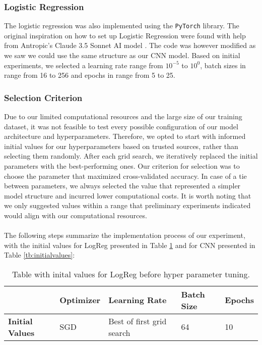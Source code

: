\subsubsection{Logistic Regression}
The logistic regression was also implemented using the \texttt{PyTorch} library. The original inspiration on how to set up Logistic Regression were found with help from Antropic's Claude 3.5 Sonnet AI model \cite{anthropic_claude_3_5_sonnet}. The code was however modified as we saw we could use the same structure as our CNN model. Based on initial experiments, we selected a learning rate range from \( 10^{-5}\) to \( 10^0 \), batch sizes in range from 16 to 256 and epochs in range from 5 to 25.

\subsubsection{Selection Criterion}
Due to our limited computational resources and the large size of our training dataset, it was not feasible to test every possible configuration of our model architecture and hyperparameters. Therefore, we opted to start with informed initial values for our hyperparameters based on trusted sources, rather than selecting them randomly. After each grid search, we iteratively replaced the initial parameters with the best-performing ones. Our criterion for selection was to choose the parameter that maximized cross-validated accuracy. In case of a tie between parameters, we always selected the value that represented a simpler model structure and incurred lower computational costs. It is worth noting that we only suggested values within a range that preliminary experiments indicated would align with our computational resources.
\\
\\
The following steps summarize the implementation process of our experiment, with the initial values for LogReg presented in Table \ref{tb:loginitial} and for CNN presented in Table \ref{tb:initialvalues}:

\begin{table}[H]
 \centering
    \caption{Table with inital values for LogReg before hyper parameter tuning.}
\begin{tabular}{|l|l|l|l|l|}
\hline
                        & \textbf{Optimizer} & \textbf{Learning Rate}    & \textbf{Batch Size} & \textbf{Epochs} \\ \hline
\textbf{Initial Values} & SGD                & Best of first grid search & 64                  & 10              \\ \hline
\end{tabular}
\label{tb:loginitial}
\end{table}

